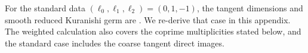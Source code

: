 \begin{remark}
\hypertarget{tag-PI11}{}\label{I:standard-deformation-credit}
For the standard data $(\ell_0,\ell_1,\ell_2)=(0,1,-1)$,
the tangent dimensions and smooth reduced Kuranishi germ are
\cite[Theorem~6.12, pp.~81--82; Proposition~6.16, p.~85]{DuEtAl2026v1}.
We re-derive that case in this appendix. The weighted calculation
also covers the coprime multiplicities stated below, and the
standard case includes the coarse tangent direct images.
\end{remark}

